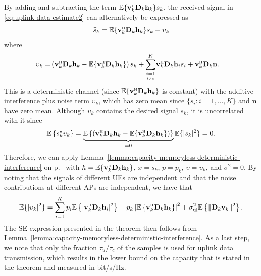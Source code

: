 \documentclass[SIG,biber]{nowfnt}
\newcommand{\vect}[1]{\mathbf{#1}}
\newcommand{\condSum}[3]{\overset{#3}{\underset{\underset{#2}{#1}}{\sum}}}
\def\Htran{\mbox{\tiny $\mathrm{H}$}}
\def\sigmaUL{\sigma^2_{\mathrm{ul}}}
\begin{document}
By adding and subtracting the term $\mathbb{E} \{ \vect{v}_k^{\Htran}\vect{D}_k\vect{h}_k \} s_k$, 
the received signal in \eqref{eq:uplink-data-estimate2} can alternatively be expressed as
	\begin{equation}
	\label{eq:uplink-data-estimate2-UatF}
\widehat{s}_k = \mathbb{E} \{ \vect{v}_k^{\Htran}\vect{D}_k\vect{h}_k \} s_k + \upsilon_k
\end{equation}
where
\begin{align} \nonumber
\upsilon_k =& \left( \vect{v}_k^{\Htran}\vect{D}_k\vect{h}_k - \mathbb{E} \{ \vect{v}_k^{\Htran}\vect{D}_k\vect{h}_k \} \right) s_k +\condSum{i=1}{i \neq k}{K}\vect{v}_k^{\Htran}\vect{D}_k\vect{h}_i s_i + \vect{v}_k^{\Htran}\vect{D}_k\vect{n}.
	\end{align}
This is a deterministic channel (since $\mathbb{E} \{ \vect{v}_k^{\Htran}\vect{D}_k\vect{h}_k \}$ is constant) with the additive interference plus noise term $\upsilon_k$, which has zero mean since $\{s_i:i=1,\ldots,K\}$ and $\vect{n}$ have zero mean. Although $\upsilon_k$ contains the desired signal $s_k$, it is uncorrelated with it since
\begin{equation}
\mathbb{E}\left\{ s_k^{\star} \upsilon_k \right\} = \underbrace{\mathbb{E}\left\{\left( \vect{v}_k^{\Htran}\vect{D}_k\vect{h}_k - \mathbb{E} \{ \vect{v}_k^{\Htran}\vect{D}_k\vect{h}_k \} \right)  \right\} }_{=0}  \mathbb{E}\{ | s_k|^2 \} = 0.
\end{equation}
Therefore, we can apply Lemma~\ref{lemma:capacity-memoryless-deterministic-interference} on p.~\pageref{lemma:capacity-memoryless-deterministic-interference} with $h =  \mathbb{E} \{ \vect{v}_k^{\Htran}\vect{D}_k\vect{h}_k \}$, $x= s_k$, $p=p_k$, $\upsilon = \upsilon_k$, and $\sigma^2=0$.
By noting that the signals of different UEs are independent and that the noise contributions at different APs are independent, we have that
\begin{equation}
\mathbb{E} \{ |\upsilon_k |^2 \} = \sum\limits_{i=1}^K p_{i}  \mathbb{E} \left\{| \vect{v}_{k}^{\Htran} \vect{D}_{k}{\vect{h}}_{i} |^2\right\}
		- p_{k} \left |\mathbb{E} \left\{  \vect{v}_{k}^{\Htran} \vect{D}_{k}{\vect{h}}_{k} \right\}\right|^2  + \sigmaUL \mathbb{E} \left\{\| \vect{D}_k \vect{v}_{k} \|^2\right\}.
\end{equation}
The SE expression presented in the theorem then follows from Lemma~\ref{lemma:capacity-memoryless-deterministic-interference}.  
 As a last step, we note that only the fraction $\tau_u/\tau_c$ of the samples is used for uplink data transmission, which results in the lower bound on the capacity that is stated in the theorem and measured in bit/s/Hz.
\end{document}
